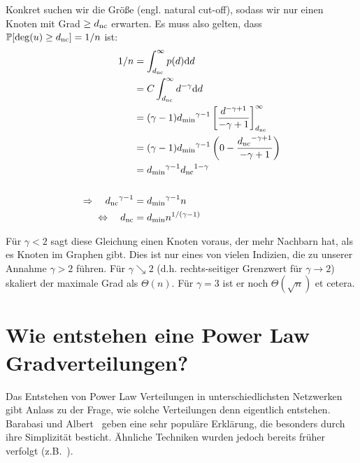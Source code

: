 Konkret suchen wir die Größe \dnc{} (engl. natural cut-off), sodass wir nur einen Knoten mit Grad $\ge {d_{\text{nc}}}$ erwarten.
Es muss also gelten, dass $\mathbb{P}\!\left[\deg(u) \ge {d_{\text{nc}}}\right] = 1 / n$ ist:
\begin{align}
    1/n                                & = \int_{{d_{\text{nc}}}}^\infty p(d) \text d d                                                               \\
                                       & = C \int_{{d_{\text{nc}}}}^\infty d^{-\gamma} \text d d                                                      \\
                                       & = (\gamma-1) {d_{\text{min}}}^{\gamma - 1} \left[ \frac{d^{-\gamma + 1}}{-\gamma +1} \right]_{{d_{\text{nc}}}}^\infty \\
                                       & = (\gamma-1) {d_{\text{min}}}^{\gamma - 1} \left( 0 - \frac{{d_{\text{nc}}}^{-\gamma + 1}}{-\gamma +1} \right)      \\
                                       & = {d_{\text{min}}}^{\gamma - 1} {d_{\text{nc}}}^{1 - \gamma}                                                        \\
    \nonumber                                                                                                                          \\
    \Rightarrow\quad {d_{\text{nc}}}^{\gamma - 1} & = {d_{\text{min}}}^{\gamma - 1} n                                                                        \\
    \Leftrightarrow\quad {d_{\text{nc}}}          & = {d_{\text{min}}} n^{1/(\gamma - 1)}
\end{align}

Für $\gamma  < 2$ sagt diese Gleichung einen Knoten voraus, der mehr Nachbarn hat, als es Knoten im Graphen gibt.
Dies ist nur eines von vielen Indizien, die zu unserer Annahme $\gamma > 2$ führen.
Für $\gamma \searrow 2$ (d.h. rechts-seitiger Grenzwert für $\gamma \to 2$) skaliert der maximale Grad als $\Theta(n)$.
Für $\gamma = 3$ ist er noch $\Theta(\sqrt{n})$ et cetera.

\section{Wie entstehen eine Power Law Gradverteilungen?}
Das Entstehen von Power Law Verteilungen in  unterschiedlichsten Netzwerken gibt Anlass zu der Frage, wie solche Verteilungen denn eigentlich entstehen.
Barabasi und Albert~\cite{barabasi1999emergence} geben eine sehr populäre Erklärung, die besonders durch ihre Simplizität besticht.
Ähnliche Techniken wurden jedoch bereits früher verfolgt (z.B.~\cite{10.2307/1716232}).

